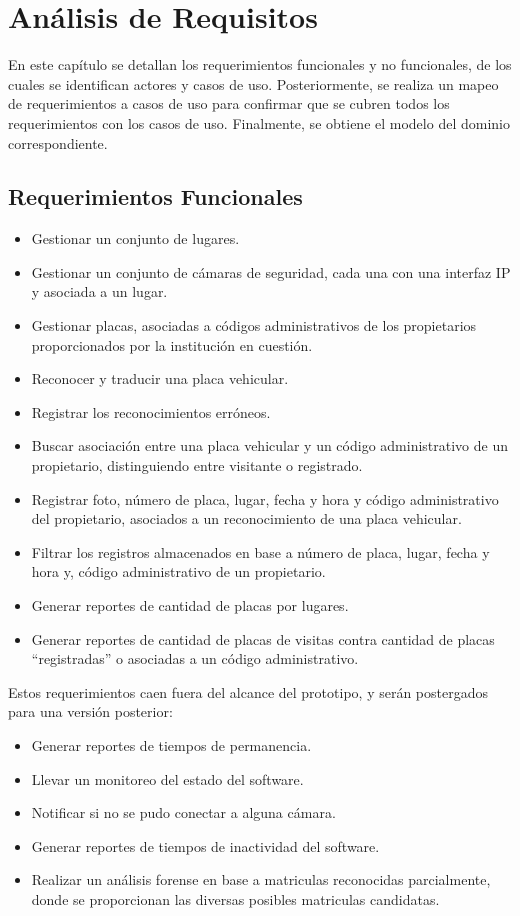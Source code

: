 \chapter{Análisis de Requisitos}
En este capítulo se detallan los requerimientos funcionales y no funcionales, de los cuales se identifican actores y casos de uso. Posteriormente, se realiza un mapeo de requerimientos a casos de uso para confirmar que se cubren todos los requerimientos con los casos de uso. Finalmente, se obtiene el modelo del dominio correspondiente.
\section{Requerimientos Funcionales}
\begin{itemize}
    \item Gestionar un conjunto de lugares.
    \item Gestionar un conjunto de cámaras de seguridad, cada una con una interfaz IP y asociada a un lugar.
    \item Gestionar placas, asociadas a códigos administrativos de los propietarios proporcionados por la institución en cuestión.
    \item Reconocer y traducir una placa vehicular. 
    \item Registrar los reconocimientos erróneos.
    \item Buscar asociación entre una placa vehicular y un código administrativo de un propietario, distinguiendo entre visitante o registrado.
    \item Registrar foto, número de placa, lugar, fecha y hora y código administrativo del propietario, asociados a un reconocimiento de una placa vehicular.
    \item Filtrar los registros almacenados en base a número de placa, lugar, fecha y hora y, código administrativo de un propietario.
    \item Generar reportes de cantidad de placas por lugares.
    \item Generar reportes de cantidad de placas de visitas contra cantidad de placas “registradas” o asociadas a un código administrativo.
\end{itemize}
Estos requerimientos caen fuera del alcance del prototipo, y serán postergados para una versión posterior:
\begin{itemize}
\item Generar reportes de tiempos de permanencia.
\item Llevar un monitoreo del estado del software.
\item Notificar si no se pudo conectar a alguna cámara.
\item Generar reportes de tiempos de inactividad del software.
\item Realizar un análisis forense en base a matriculas reconocidas parcialmente, donde se proporcionan las diversas posibles matriculas candidatas.
\end{itemize}


